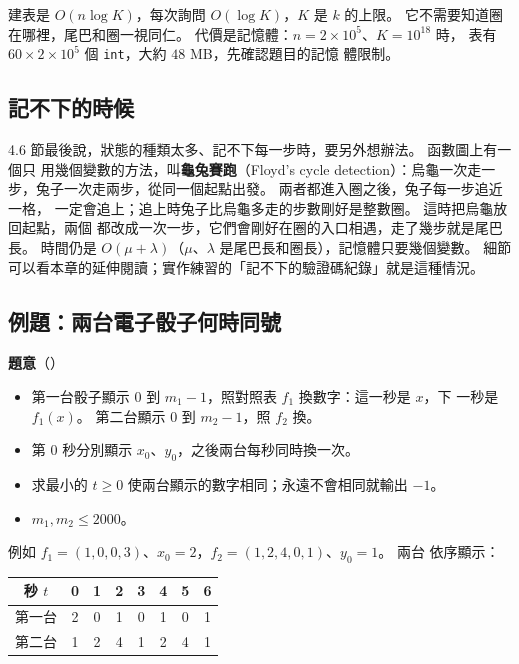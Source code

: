 建表是 $O(n \log K)$，每次詢問 $O(\log K)$，$K$ 是 $k$ 的上限。 它不需要知道圈
在哪裡，尾巴和圈一視同仁。 代價是記憶體：$n = 2 \times 10^5$、$K = 10^{18}$ 時，
表有 $60 \times 2 \times 10^5$ 個 \texttt{int}，大約 $48$ MB，先確認題目的記憶
體限制。

\subsection{記不下的時候}

4.6 節最後說，狀態的種類太多、記不下每一步時，要另外想辦法。 函數圖上有一個只
用幾個變數的方法，叫\textbf{龜兔賽跑}（Floyd's cycle detection）：烏龜一次走一
步，兔子一次走兩步，從同一個起點出發。 兩者都進入圈之後，兔子每一步追近一格，
一定會追上；追上時兔子比烏龜多走的步數剛好是整數圈。 這時把烏龜放回起點，兩個
都改成一次一步，它們會剛好在圈的入口相遇，走了幾步就是尾巴長。 時間仍是
$O(\mu + \lambda)$（$\mu$、$\lambda$ 是尾巴長和圈長），記憶體只要幾個變數。
細節可以看本章的延伸閱讀；實作練習的「記不下的驗證碼紀錄」就是這種情況。

\subsection{例題：兩台電子骰子何時同號}
\label{sec:ex-dice}

\textbf{題意}（）

\begin{itemize}
\item 第一台骰子顯示 $0$ 到 $m_1 - 1$，照對照表 $f_1$ 換數字：這一秒是 $x$，下
一秒是 $f_1(x)$。 第二台顯示 $0$ 到 $m_2 - 1$，照 $f_2$ 換。
\item 第 $0$ 秒分別顯示 $x_0$、$y_0$，之後兩台每秒同時換一次。
\item 求最小的 $t \ge 0$ 使兩台顯示的數字相同；永遠不會相同就輸出 $-1$。
\item $m_1, m_2 \le 2000$。
\end{itemize}

例如 $f_1 = (1, 0, 0, 3)$、$x_0 = 2$，$f_2 = (1, 2, 4, 0, 1)$、$y_0 = 1$。 兩台
依序顯示：

\begin{center}
\begin{tabular}{c|ccccccc}
\toprule
秒 $t$ & 0 & 1 & 2 & 3 & 4 & 5 & 6 \\
\midrule
第一台 & 2 & 0 & 1 & 0 & 1 & 0 & 1 \\
第二台 & 1 & 2 & 4 & 1 & 2 & 4 & 1 \\
\bottomrule
\end{tabular}
\end{center}

